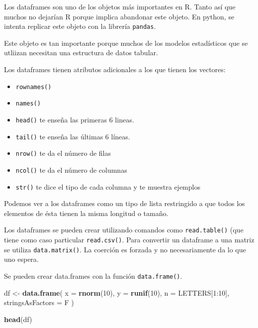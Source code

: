 \documentclass[]{article}
\newenvironment{Shaded}{\begin{snugshade}}{\end{snugshade}}
\newcommand{\KeywordTok}[1]{\textcolor[rgb]{0.13,0.29,0.53}{\textbf{{#1}}}}
\newcommand{\DataTypeTok}[1]{\textcolor[rgb]{0.13,0.29,0.53}{{#1}}}
\newcommand{\DecValTok}[1]{\textcolor[rgb]{0.00,0.00,0.81}{{#1}}}
\newcommand{\StringTok}[1]{\textcolor[rgb]{0.31,0.60,0.02}{{#1}}}
\newcommand{\NormalTok}[1]{{#1}}
\begin{document}
Los dataframes son uno de los objetos más importantes en R. Tanto así
que muchos no dejarían R porque implica abandonar este objeto. En
python, se intenta replicar este objeto con la librería \texttt{pandas}.

Este objeto es tan importante porque muchos de los modelos estadísticos
que se utliizan necesitan una estructura de datos tabular.

Los dataframes tienen atributos adicionales a los que tienen los
vectores:

\begin{itemize}
\itemsep1pt\parskip0pt
\item
  \texttt{rownames()}
\item
  \texttt{names()}
\item
  \texttt{head()} te enseña las primeras 6 lineas.
\item
  \texttt{tail()} te enseña las últimas 6 líneas.
\item
  \texttt{nrow()} te da el número de filas
\item
  \texttt{ncol()} te da el número de columnas
\item
  \texttt{str()} te dice el tipo de cada columna y te muestra ejemplos
\end{itemize}

Podemos ver a los dataframes como un tipo de lista restringido a que
todos los elementos de ésta tienen la misma longitud o tamaño.

Los dataframes se pueden crear utilizando comandos como
\texttt{read.table()} (que tiene como caso particular
\texttt{read.csv()}. Para convertir un dataframe a una matriz se utiliza
\texttt{data.matrix()}. La coerción es forzada y no necesariamente da lo
que uno espera.

Se pueden crear data.frames con la función \texttt{data.frame()}.

\begin{Shaded}
\begin{Highlighting}[]
\NormalTok{df <-}\StringTok{ }\KeywordTok{data.frame}\NormalTok{(}
  \DataTypeTok{x =} \KeywordTok{rnorm}\NormalTok{(}\DecValTok{10}\NormalTok{),}
  \DataTypeTok{y =} \KeywordTok{runif}\NormalTok{(}\DecValTok{10}\NormalTok{),}
  \DataTypeTok{n =} \NormalTok{LETTERS[}\DecValTok{1}\NormalTok{:}\DecValTok{10}\NormalTok{],}
  \DataTypeTok{stringsAsFactors =} \NormalTok{F}
\NormalTok{)}

\KeywordTok{head}\NormalTok{(df)}
\end{Highlighting}
\end{Shaded}
\end{document}

